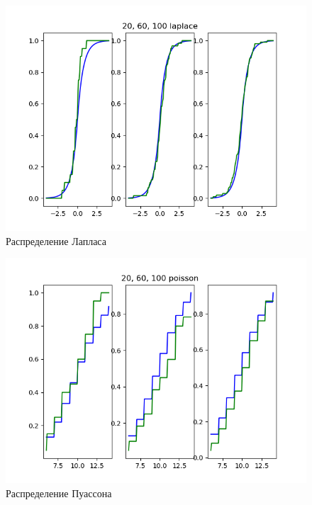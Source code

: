 \documentclass[a4]{article}
\begin{document}
\begin{center}
\begin{figure}[h!]
				\includegraphics[width=\textwidth]{laplaceemp.png}
				\caption[Распределение Лапласа]{Распределение Лапласа}
			\end{figure}
			\newpage
			\begin{figure}[h!]
				\includegraphics[width=\textwidth]{poissonemp.png}
				\caption[Распределение Пуассона]{Распределение Пуассона}
			\end{figure}
			\newpage
			\begin{figure}[h!]

\end{figure}
\end{center}
\end{document}
